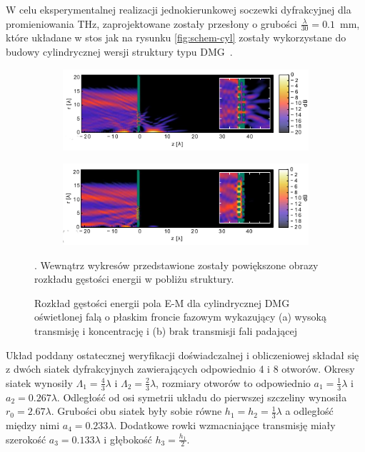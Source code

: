 W celu eksperymentalnej realizacji jednokierunkowej soczewki dyfrakcyjnej dla promieniowania THz, zaprojektowane zostały przesłony o grubości $\frac{\lambda}{30}=0.1$~mm, które układane w stos jak na rysunku \ref{fig:schem-cyl} zostały wykorzystane do budowy cylindrycznej wersji struktury typu DMG~\cite{Yavorskiy:14}. 
\begin{figure}[tb]
	\begin{subfigure}{\textwidth}
		\includegraphics[width=\textwidth]{images/dmg/express-high-kontrast-trans.png}
		\caption{}
	\end{subfigure}

	\begin{subfigure}{\textwidth}
		\includegraphics[width=\textwidth]{images/dmg/express-high-kontrast-block.png}
		\caption{}
	\end{subfigure}
	\caption{Rozkład gęstości energii pola E-M dla cylindrycznej DMG oświetlonej falą o płaskim froncie fazowym wykazujący (a) wysoką transmisję i koncentrację i (b) brak transmisji fali padającej~\cite{Yavorskiy:14}}. Wewnątrz wykresów przedstawione zostały powiększone obrazy rozkładu gęstości energii w pobliżu struktury.
	\label{fig:cyl-gest-ene}
\end{figure}

Układ poddany ostatecznej weryfikacji doświadczalnej i obliczeniowej składał się z dwóch siatek dyfrakcyjnych zawierających odpowiednio 4 i 8 otworów. Okresy siatek wynosiły $\Lambda_1=\frac{4}{3} \lambda$ i $\Lambda_2=\frac{2}{3} \lambda$, rozmiary otworów to odpowiednio $a_1=\frac{1}{3}\lambda$ i $a_2=0.267 \lambda$. Odległość od osi symetrii układu do pierwszej szczeliny wynosiła $r_0=2.67\lambda$. Grubości obu siatek były sobie równe $h_1=h_2=\frac{1}{3}\lambda$ a odległość między nimi $a_4=0.233\lambda$. Dodatkowe rowki wzmacniające transmisję miały szerokość $a_3=0.133\lambda$ i głębokość $h_3=\frac{h_1}{2}$. 

